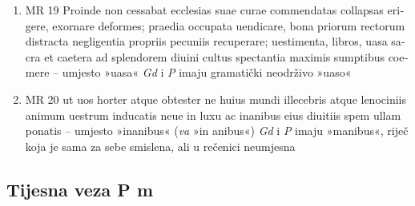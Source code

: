 \documentclass[a5paper,twoside]{article}
\begin{document}
\begin{enumerate}[label=\alph*)]
\item MR 19 \textlatin{Proinde non cessabat ecclesias suae curae commendatas collapsas erigere, exornare deformes; praedia occupata uendicare, bona priorum rectorum distracta negligentia propriis pecuniis recuperare; uestimenta, libros, uasa sacra et caetera ad splendorem diuini cultus spectantia maximis sumptibus coemere} – umjesto »uasa« \textit{Gd} i \textit{P} imaju gramatički neodrživo »uaso«
\item MR 20 \textlatin{ut uos horter atque obtester ne huius mundi illecebris atque lenociniis animum uestrum inducatis neue in luxu ac inanibus eius diuitiis spem ullam ponatis} – umjesto »inanibus« (\textit{va} »in anibus«) \textit{Gd} i \textit{P} imaju »manibus«, riječ koja je sama za sebe smislena, ali u rečenici neumjesna
\end{enumerate}
\subsection{Tijesna veza P m}
\end{document}
